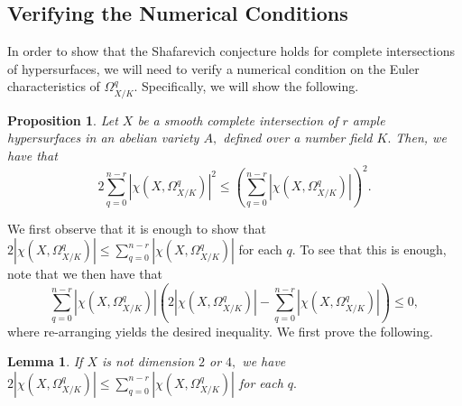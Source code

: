 \documentclass{article}
\newtheorem{prop}[thm]{Proposition}
\newtheorem{lemma}[thm]{Lemma}
\theoremstyle{definition}
\theoremstyle{remark}
\begin{document}
\subsection{Verifying the Numerical Conditions}
In order to show that the Shafarevich conjecture holds for complete intersections of hypersurfaces, we will need to verify a numerical condition on the Euler characteristics of $\Omega^q_{X/K}.$ Specifically, we will show the following.
\begin{prop}\label{prop: numerical condition}
Let $X$ be a smooth complete intersection of $r$ ample hypersurfaces in an abelian variety $A,$ defined over a number field $K.$ Then, we have that 
\[2\sum\limits_{q=0}^{n-r} |\chi(X, \Omega^q_{X/K})|^2 \leq (\sum\limits_{q=0}^{n-r} |\chi(X, \Omega^q_{X/K})|)^2.\]
\end{prop}
We first observe that it is enough to show that $2|\chi(X, \Omega^q_{X/K})| \leq \sum\limits_{q=0}^{n-r}|\chi(X, \Omega^q_{X/K})|$ for each $q.$ To see that this is enough, note that we then have that \[\sum\limits_{q=0}^{n-r} |\chi(X, \Omega^q_{X/K})|\left(2|\chi(X, \Omega^q_{X/K})| - \sum\limits_{q=0}^{n-r}|\chi(X, \Omega^q_{X/K})|\right) \leq 0,\] where re-arranging yields the desired inequality. We first prove the following.
\begin{lemma}\label{lem: most cases numerical condition}
If $X$ is not dimension $2$ or $4,$ we have $2|\chi(X, \Omega^q_{X/K})| \leq \sum\limits_{q=0}^{n-r}|\chi(X, \Omega^q_{X/K})|$ for each $q.$
\end{lemma}
\end{document}
